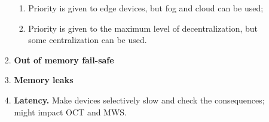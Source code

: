 \begin{enumerate}
\begin{enumerate}
\begin{enumerate}
\begin{enumerate}
                            \item Priority is given to edge devices, but fog and cloud can be used;
                            \item Priority is given to the maximum level of decentralization, but some centralization can be used.
                        \end{enumerate}
                    \item \textbf{Out of memory fail-safe}
                    \item \textbf{Memory leaks}
                    \item \textbf{Latency.} Make devices selectively slow and check the consequences; might impact OCT and MWS.
                \end{enumerate}
        \end{enumerate}
\end{enumerate}





    
    



